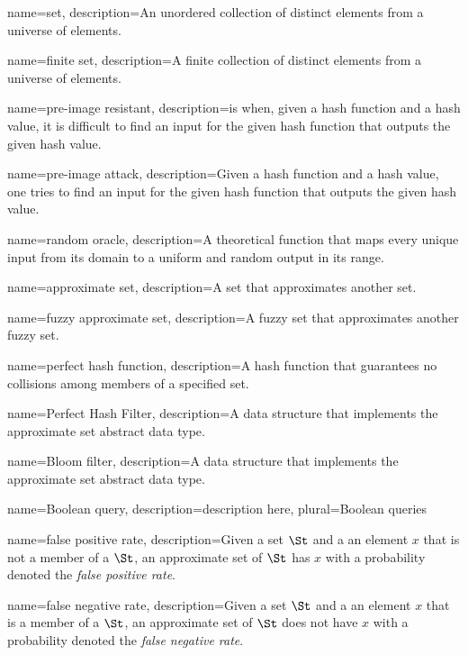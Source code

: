 {
    name={set},
    description={An unordered collection of distinct elements from a universe of elements.}
}

{
    name={finite set},
    description={A finite collection of distinct elements from a universe of elements.}
}

{
    name={pre-image resistant},
    description={is when, given a hash function and a hash value, it is difficult to find an input for the given hash function that outputs the given hash value.}
}

{
    name={pre-image attack},
    description={Given a hash function and a hash value, one tries to find an input for the given hash function that outputs the given hash value.}
}

{
    name={random oracle},
    description={A theoretical function that maps every unique input from its domain to a uniform and random output in its range.}
}

{
    name={approximate set},
    description={A set that approximates another set.}
}

{
    name={fuzzy approximate set},
    description={A fuzzy set that approximates another fuzzy set.}
}

{
    name={perfect hash function},
    description={A hash function that guarantees no collisions among members of a specified set.}
}

{
    name={Perfect Hash Filter},
    description={A data structure that implements the approximate set abstract data type.}
}

{
    name={Bloom filter},
    description={A data structure that implements the approximate set abstract data type.}
}

{
    name={Boolean query},
    description={description here},
    plural={Boolean queries}
}

{
    name={false positive rate},
    description={Given a set $\St$ and a an element $x$ that is not a member of a $\St$, an approximate set of $\St$ has $x$ with a probability denoted the \emph{false positive rate}}.
}

{
    name={false negative rate},
    description={Given a set $\St$ and a an element $x$ that is a member of a $\St$, an approximate set of $\St$ does not have $x$ with a probability denoted the \emph{false negative rate}}.
}

